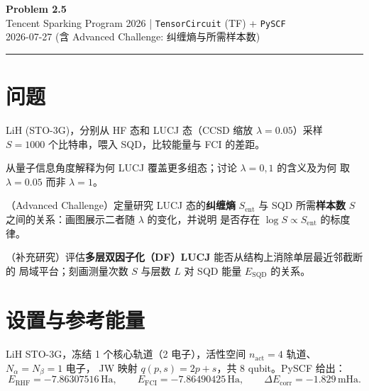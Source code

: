 \documentclass[11pt,a4paper]{article}
\newcommand{\Ha}{\,\text{Ha}}
\newcommand{\mHa}{\,\text{mHa}}
\begin{document}
\begin{center}
  {\LARGE\bfseries Problem 2.5}\\[6pt]
  {\normalsize Tencent Sparking Program 2026 \quad | \quad
   \texttt{TensorCircuit} (TF) + \texttt{PySCF}}\\[2pt]
  {\small 2026-07-27 \quad (含 Advanced Challenge: 纠缠熵与所需样本数)}
\end{center}
\vspace{4pt}\hrule\vspace{8pt}

\section{问题}
\begin{description}[leftmargin=1.4em,style=nextline]
  \item[\textbf{(a)}]LiH (STO-3G)，分别从 HF 态和 LUCJ 态（CCSD 缩放 $\lambda=0.05$）采样
  $S=1000$ 个比特串，喂入 SQD，比较能量与 FCI 的差距。
  \item[\textbf{(b)}]从量子信息角度解释为何 LUCJ 覆盖更多组态；讨论 $\lambda=0,1$ 的含义及为何
  取 $\lambda=0.05$ 而非 $\lambda=1$。
  \item[\textbf{(c)}]（Advanced Challenge）定量研究 LUCJ 态的\textbf{纠缠熵} $S_{\mathrm{ent}}$
  与 SQD 所需\textbf{样本数} $S$ 之间的关系：画图展示二者随 $\lambda$ 的变化，并说明
  是否存在 $\log S\propto S_{\mathrm{ent}}$ 的标度律。
  \item[\textbf{(d)}]（补充研究）评估\textbf{多层双因子化（DF）LUCJ} 能否从结构上消除单层最近邻截断的
  局域平台；刻画测量次数 $S$ 与层数 $L$ 对 SQD 能量 $E_{\mathrm{SQD}}$ 的关系。
\end{description}

\section{设置与参考能量}
LiH STO-3G，冻结 1 个核心轨道（2 电子），活性空间 $n_{\text{act}}=4$ 轨道、$N_\alpha=N_\beta=1$ 电子，
JW 映射 $q(p,s)=2p+s$，共 8 qubit。PySCF 给出：
\[
  E_{\text{RHF}}=-7.86307516\Ha,\qquad
  E_{\text{FCI}}=-7.86490425\Ha,\qquad
  \Delta E_{\text{corr}}=-1.829\mHa .
\]
\end{document}
